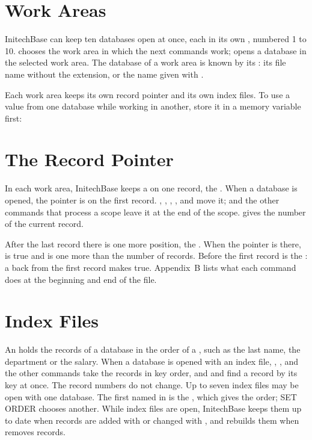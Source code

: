 \section{Work Areas}
InitechBase can keep ten databases open at once, each in its own
, numbered 1 to 10.   chooses the work area in
which the next commands work;  opens a database in the selected work
area.  The database of a work area is known by its : its file name
without the extension, or the name given with .

Each work area keeps its own record pointer and its own index files.  To use a
value from one database while working in another, store it in a memory
variable first:

\section{The Record Pointer}
In each work area, InitechBase keeps a  on one record, the
.  When a database is opened, the pointer is on the first
record.  , , , ,  and
 move it;  and the other commands that process a scope
leave it at the end of the scope.   gives the number of the
current record.

After the last record there is one more position, the .
When the pointer is there,  is true and  is one more
than the number of records.  Before the first record is the : a  back from the first record makes  true.
Appendix~B lists what each command does at the beginning and end of the file.

\section{Index Files}
An  holds the records of a database in the order of a
, such as the last name, the department or the salary.  When a
database is opened with an index file, , ,  and
the other commands take the records in key order, and  and 
find a record by its key at once.  The record numbers do not change.
Up to seven index files may be open with one database.  The first named in
 is the , which gives the order; SET ORDER chooses
another.  While index files are open, InitechBase keeps them up to date when
records are added with  or changed with , and
rebuilds them when  removes records.

